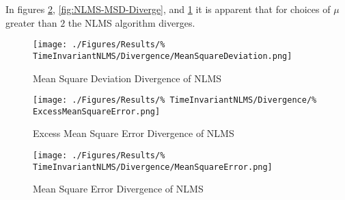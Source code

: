 In figures \ref{fig:NLMS-MSE-Diverge}, \ref{fig:NLMS-MSD-Diverge}, %
and \ref{fig:NLMS-EMSE-Diverge} it is apparent that %
for choices of $\mu$ greater than $2$ the NLMS algorithm diverges.
\begin{figure}[ht]
	\centering
	\begin{minipage}{0.49\textwidth}
		\centering
		\texttt{[image: ./Figures/Results/\%
		TimeInvariantNLMS/Divergence/MeanSquareDeviation.png]}
		\captionsetup{width=0.75\linewidth}
		\caption{Mean Square Deviation Divergence of NLMS}
		\label{fig:NLMS-MSD-Diverge}
	\end{minipage}
	\begin{minipage}{0.49\textwidth}
		\centering
		\texttt{[image: ./Figures/Results/\%
		TimeInvariantNLMS/Divergence/\%
		ExcessMeanSquareError.png]}
		\captionsetup{width=0.75\linewidth}
		\caption{Excess Mean Square Error Divergence of NLMS}
		\label{fig:NLMS-EMSE-Diverge}
	\end{minipage}
\end{figure}
\begin{figure}[ht]
	\centering
	\texttt{[image: ./Figures/Results/\%
	TimeInvariantNLMS/Divergence/MeanSquareError.png]}
	\captionsetup{width=0.75\linewidth}
	\caption{Mean Square Error Divergence of NLMS}
	\label{fig:NLMS-MSE-Diverge}
\end{figure}

